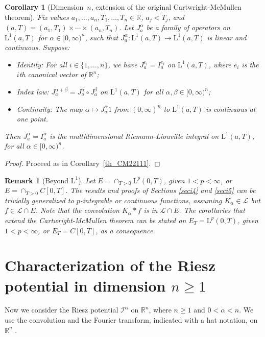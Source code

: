 \documentclass[12pt,reqno]{amsart}
\theoremstyle{plain}
\newtheorem{corollary}[theorem]{Corollary}
\newtheorem{remark}[theorem]{Remark}
\numberwithin{equation}{section} %
\begin{document}
\begin{corollary}[Dimension~$n$, extension of the original Cartwright-McMullen theorem] \label{th_CM2244}
Fix values $a_1,\ldots,a_n,T_1,\ldots,T_n\in \mathbb{R}$, $a_j<T_j$, and $(a,T)=(a_1,T_1)\times\cdots\times (a_n,T_n)$. Let $J_a^\alpha$ be a family of operators on $\mathrm{L}^1(a,T)$ for $\alpha\in [0,\infty)^n$, such that $J_a^\alpha:\mathrm{L}^1(a,T)\rightarrow \mathrm{L}^1(a,T)$ is linear and continuous. Suppose: 
\begin{itemize}
\item Identity: For all $i\in\{1,\ldots,n\}$, we have $J_a^{e_i}=I_a^{e_i}$ on $\mathrm{L}^1(a,T)$, where $e_i$ is the $i$th canonical vector of $\mathbb{R}^n$;
\item Index law: $J_a^{\alpha+\beta}=J_a^\alpha\circ J_a^\beta$ on $\mathrm{L}^1(a,T)$ for all $\alpha,\beta\in [0,\infty)^n$; 
\item Continuity: The map $\alpha\mapsto J_a^{\alpha} 1$ from $(0,\infty)^n$ to $\mathrm{L}^1(a,T)$ is continuous at one point.
\end{itemize}
Then $J_a^\alpha=I_a^\alpha$ is the multidimensional Riemann-Liouville integral on $\mathrm{L}^1(a,T)$, for all $\alpha\in [0,\infty)^n$.
\end{corollary}
\begin{proof}
Proceed as in Corollary~\ref{th_CM22111}.
\end{proof}

\begin{remark}[Beyond $\mathrm{L}^1$] \normalfont
Let $E=\cap_{T>0} \mathrm{L}^p(0,T)$, given $1< p<\infty$, or $E=\cap_{T>0} C[0,T]$. The results and proofs of Sections \ref{seci4} and \ref{seci5} can be trivially generalized to $p$-integrable or continuous functions, assuming $K_{\alpha}\in\mathcal{L}$ but $f\in\mathcal{L}\cap E$. Note that the convolution $K_{\alpha}\ast f$ is in $\mathcal{L}\cap E$. The corollaries that extend the Cartwright-McMullen theorem can be stated on $E_T=\mathrm{L}^p(0,T)$, given $1< p<\infty$, or $E_T=C[0,T]$, as a consequence.
\end{remark}




\section{Characterization of the Riesz potential in dimension $n\geq 1$}

Now we consider the Riesz potential $\mathcal{I}^\alpha$ on $\mathbb{R}^n$, where $n\geq 1$ and $0<\alpha<n$. We use the convolution and the Fourier transform, indicated with a hat notation, on $\mathbb{R}^n$ \cite{samko_fcaa}.
\end{document}
